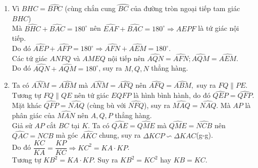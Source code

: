\begin{ex}
{\begin{center}
\begin{tikzpicture}
    \end{tikzpicture}
    \end{center}
\begin{enumerate}
	\item Vì $ \widehat{BHC}= \widehat {BPC}$ (cùng chắn cung $\wideparen{BC}$ của đường tròn ngoại tiếp tam giác $BHC$)\\
	Mà $ \widehat{BHC}+ \widehat{BAC}=180^\circ$ nên $ \widehat{EAF}+ \widehat{BAC}=180^\circ \Rightarrow AEPF$ là tứ giác nội tiếp.\\ Do đó $ \widehat{AEP}+ \widehat{AFP}=180^\circ \Rightarrow  \widehat{AFN}+ \widehat{AEM}=180^\circ$.\\
	Các tứ giác $ANFQ$ và $AMEQ$ nội tiếp nên $ \widehat{AQN}=\widehat{AFN}; \widehat {AQM} = \widehat {AEM}$.\\
	Do đó $ \widehat{AQN}+ \widehat{AQM}=180^ \circ$, suy ra $M, Q, N$ thẳng hàng.
	\item Ta có $ \widehat{ANM}= \widehat{ABM}$ mà $\widehat{ANM} = \widehat{AFQ}$ nên $\widehat{AFQ}= \widehat{ABM},$ suy ra $FQ \parallel PE.$ Tương tự $ FQ \parallel QE$ nên tứ giác $EQFP$ là hình bình hành, do đó $ \widehat{QEP}= \widehat{QFP}.$\\
	Mặt khác $\widehat{QFP}=\widehat{NAQ}$ (cùng bù với $\widehat{NFQ}$), suy ra $\widehat{MAQ}= \widehat{NAQ}.$ Mà $AP$ là phân giác của $\widehat{MAN}$ nên $A, Q, P$ thẳng hàng.\\
	Giả sử $AP$ cắt $BC$ tại $K$. Ta có $\widehat{QAE}= \widehat{QME}$ mà $\widehat{QME}= \widehat{NCB}$ nên $\widehat{QAC}=\widehat{NCB}$ mà góc $\widehat{AKC}$ chung, suy ra $\Delta KCP \backsim \Delta KAC$(g-g).\\
	Do đó $\dfrac{KC}{KA}= \dfrac{KP}{KC} \Rightarrow KC^2=KA \cdot KP$. \\
	Tương tự $KB^2= KA \cdot KP.$ Suy ra $KB^2=KC^2$ hay $KB=KC.$
	\end{enumerate}  
    }
\end{ex}

